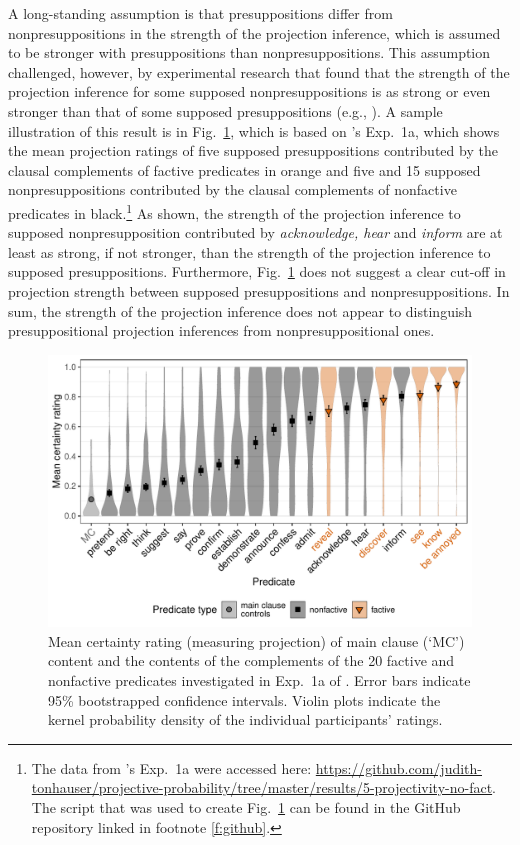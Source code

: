 \documentclass[11pt,fleqn]{article}
\newcommand{\6}{\mbox{$[\hspace*{-.6mm}[$}}
\newcommand{\9}{\mbox{$]\hspace*{-.6mm}]$}}
\newcommand{\citepos}[1]{\citeauthor{#1}'s \citeyear{#1}}
\begin{document}
A long-standing assumption is that presuppositions differ from nonpresuppositions in the strength of the projection inference, which is assumed to be stronger with presuppositions than nonpresuppositions. This assumption challenged, however, by experimental research that found that the strength of the projection inference for some supposed nonpresuppositions is as strong or even stronger than that of some supposed presuppositions (e.g., \citealt{demarneffe-etal-sub23,degen-tonhauser-language}).  A sample illustration of this result is in Fig.~\ref{fig:dt1a}, which is based on \citepos{degen-tonhauser-language} Exp.~1a, which shows the mean projection ratings of five supposed presuppositions contributed by the clausal complements of factive predicates in \color{orange}orange \color{black} and five and 15 supposed nonpresuppositions contributed by the clausal complements of nonfactive predicates in black.\footnote{The data from \citepos{degen-tonhauser-language} Exp.~1a were accessed here: \url{https://github.com/judith-tonhauser/projective-probability/tree/master/results/5-projectivity-no-fact}. The script that was used to create Fig.~\ref{fig:dt1a} can be found in the GitHub repository linked in footnote \ref{f:github}.} As shown, the strength of the projection inference to supposed nonpresupposition contributed by \emph{acknowledge, hear} and \emph{inform} are at least as strong, if not stronger, than the strength of the projection inference to supposed presuppositions. Furthermore, Fig.~\ref{fig:dt1a} does not suggest a clear cut-off in projection strength between supposed presuppositions and nonpresuppositions. In sum, the strength of the projection inference does not appear to distinguish presuppositional projection inferences from nonpresuppositional ones.

\begin{figure}[h!]
\centering
\includegraphics[width=.8\textwidth]{../../../results/main/graphs/mean-certainty-by-predicateType}
\caption{Mean certainty rating (measuring projection) of main clause (`MC') content and the contents of the complements of the 20 \color{orange}factive \color{black} and \color{black}nonfactive \color{black} predicates investigated in Exp.~1a of \citealt{degen-tonhauser-language}. Error bars indicate 95\% bootstrapped confidence intervals. Violin plots indicate the kernel probability density of the individual participants' ratings.}\label{fig:dt1a}
\end{figure}
\end{document}
